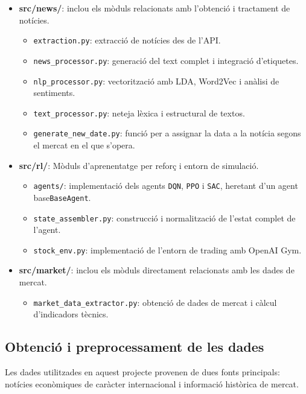 \documentclass[12pt,a4paper,twoside]{book}
\begin{document}
\begin{itemize}
    \item \textbf{src/news/}: inclou els mòduls relacionats amb l'obtenció i tractament de notícies.
    \begin{itemize}
        \item \texttt{extraction.py}: extracció de notícies des de l'API.
        \item \texttt{news\_processor.py}: generació del text complet i integració d'etiquetes.
        \item \texttt{nlp\_processor.py}: vectorització amb LDA, Word2Vec i anàlisi de sentiments.
        \item \texttt{text\_processor.py}: neteja lèxica i estructural de textos.
        \item \texttt{generate\_new\_date.py}: funció per a assignar la data a la notícia segons el mercat en el que s'opera.
    \end{itemize}

    \item \textbf{src/rl/}: Mòduls d'aprenentatge per reforç i entorn de simulació.
    \begin{itemize}
        \item \texttt{agents/}: implementació dels agents \texttt{DQN}, \texttt{PPO} i \texttt{SAC}, heretant d'un agent base\texttt{BaseAgent}.
        \item \texttt{state\_assembler.py}: construcció i normalització de l'estat complet de l'agent.
        \item \texttt{stock\_env.py}: implementació de l'entorn de trading amb OpenAI Gym.
    \end{itemize}

    \item \textbf{src/market/}: inclou els mòduls directament relacionats amb les dades de mercat.
    \begin{itemize}
        \item \texttt{market\_data\_extractor.py}: obtenció de dades de mercat i càlcul d'indicadors tècnics.
    \end{itemize}
\end{itemize}

\subsection{Obtenció i preprocessament de les dades}

Les dades utilitzades en aquest projecte provenen de dues fonts principals: notícies econòmiques de caràcter internacional i informació històrica de mercat.
\end{document}
